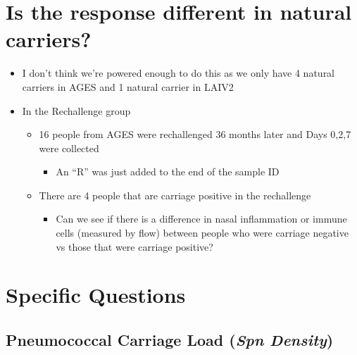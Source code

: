 \documentclass[
]{book}
\providecommand{\tightlist}{%
  \setlength{\itemsep}{0pt}\setlength{\parskip}{0pt}}
\begin{document}
\hypertarget{is-the-response-different-in-natural-carriers}{%
\section{Is the response different in natural carriers?}\label{is-the-response-different-in-natural-carriers}}

\begin{itemize}
\tightlist
\item
  I don't think we're powered enough to do this as we only have 4 natural carriers in AGES and 1 natural carrier in LAIV2
\end{itemize}

\begin{itemize}
\item
  In the Rechallenge group

  \begin{itemize}
  \item
    16 people from AGES were rechallenged 36 months later and Days 0,2,7 were collected

    \begin{itemize}
    \tightlist
    \item
      An ``R'' was just added to the end of the sample ID
    \end{itemize}
  \item
    There are 4 people that are carriage positive in the rechallenge

    \begin{itemize}
    \tightlist
    \item
      Can we see if there is a difference in nasal inflammation or immune cells (measured by flow) between people who were carriage negative vs those that were carriage positive?
    \end{itemize}
  \end{itemize}
\end{itemize}

\hypertarget{specific-questions}{%
\section{Specific Questions}\label{specific-questions}}

\hypertarget{pneumococcal-carriage-load-spn-density}{%
\subsection{\texorpdfstring{Pneumococcal Carriage Load (\emph{Spn Density})}{Pneumococcal Carriage Load (Spn Density)}}\label{pneumococcal-carriage-load-spn-density}}
\end{document}
